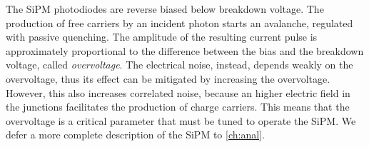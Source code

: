 The SiPM photodiodes are reverse biased below breakdown voltage. The production
of free carriers by an incident photon starts an avalanche, regulated with
passive quenching. The amplitude of the resulting current pulse is
approximately proportional to the difference between the bias and the breakdown
voltage, called \emph{overvoltage}. The electrical noise, instead, depends
weakly on the overvoltage, thus its effect can be mitigated by increasing the
overvoltage. However, this also increases correlated noise, because an higher
electric field in the junctions facilitates the production of charge carriers.
This means that the overvoltage is a critical parameter that must be tuned to
operate the SiPM. We defer a more complete description of the SiPM to
\autoref{ch:anal}.
